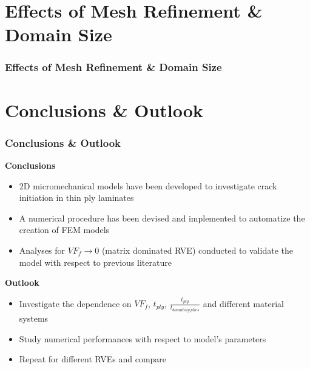 \documentclass[first,firstsupp,lastsupp,handout,last,hyperref,table]{ETHclass}
\begin{document}
\section[Mesh \& Domain Size]{Effects of Mesh Refinement \& Domain Size}

\begin{frame}
\frametitle{\small Effects of Mesh Refinement \& Domain Size}

\end{frame}

\section[Conclusions]{Conclusions \& Outlook}

\begin{frame}
\frametitle{\vspace*{0.5cm} Conclusions \& Outlook}
\vspace{-0.75cm}
\centering
\scriptsize
\begin{alertblock}{\footnotesize \bf{Conclusions}}
\begin{itemize}
   	\item 2D micromechanical models have been developed to investigate crack initiation in thin ply laminates
	\item A numerical procedure has been devised and implemented to automatize the creation of FEM models
	\item Analyses for $VF_{f}\to 0$ (matrix dominated RVE) conducted to validate the model with respect to previous literature
\end{itemize}
\end{alertblock}
\begin{alertblock}{\footnotesize \bf{Outlook}}
\begin{itemize}
	\item Investigate the dependence on $VF_{f}$, $t_{ply}$, $\frac{t_{ply}}{t_{bounding\ plies}}$ and different material systems\\[9pt]
	\item Study numerical performances with respect to model's parameters\\[9pt]
	\item Repeat for different RVEs and compare
\end{itemize}
\end{alertblock}
\end{frame}

\end{document}
